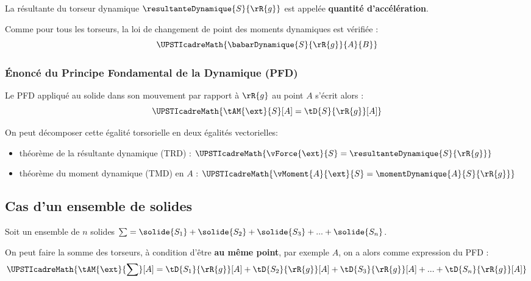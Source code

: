 \documentclass[12pt]{article}
\begin{document}
La résultante du torseur dynamique $\resultanteDynamique{S}{\rR{g}}$ est appelée \textbf{quantité d'accélération}.
 
Comme pour tous les torseurs, la loi de changement de point des moments dynamiques est vérifiée : 
\[ \UPSTIcadreMath{\babarDynamique{S}{\rR{g}}{A}{B}} \]

\subsubsection{Énoncé du Principe Fondamental de la Dynamique (PFD)}

\noindent Le PFD appliqué au solide  dans son mouvement par rapport à $\rR{g}$ au point $A$ s'écrit alors : 
\[ \UPSTIcadreMath{\tAM{\ext}{S}[A]=\tD{S}{\rR{g}}[A]} \] 

\noindent On peut décomposer cette égalité torsorielle en deux égalités vectorielles:
\begin{itemize}
\item théorème de la résultante dynamique (TRD) : $\UPSTIcadreMath{\vForce{\ext}{S}=\resultanteDynamique{S}{\rR{g}}}$
\item théorème du moment dynamique (TMD) en $A$ : $\UPSTIcadreMath{\vMoment{A}{\ext}{S}=\momentDynamique{A}{S}{\rR{g}}}$
\end{itemize}


\subsection{Cas d'un ensemble de solides}

Soit un ensemble de $n$ solides $\sum = \solide{S_1}+\solide{S_2}+\solide{S_3}+...+\solide{S_n}$.

On peut faire la somme des torseurs, à condition d'être \textbf{au même point}, par exemple $A$, on a alors comme expression du PFD :
\[ \UPSTIcadreMath{\tAM{\ext}{\sum}[A]=\tD{S_1}{\rR{g}}[A]+\tD{S_2}{\rR{g}}[A]+\tD{S_3}{\rR{g}}[A]+...+\tD{S_n}{\rR{g}}[A]} \] 
\end{document}
